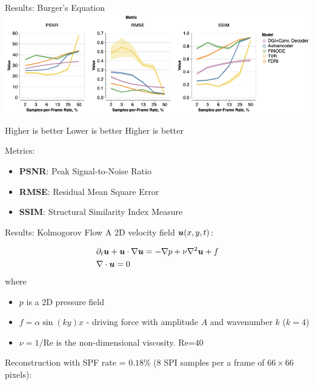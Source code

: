 \documentclass[8pt]{beamer}
\begin{document}
\begin{frame}{Results: Burger's Equation}
	\includegraphics[width=\textwidth]{Figures/cs_burgers_psnr.png}
	
	\vspace{1em}
	
	\hspace{2em} Higher is better \hspace{2.6em} Lower is better \hspace{2.6em} Higher is better
	
	\vspace{1em}
	Metrics:
	\begin{itemize}
		\item \textbf{PSNR}: Peak Signal-to-Noise Ratio 
		\item \textbf{RMSE}: Residual Mean Square Error
		\item \textbf{SSIM}: Structural Similarity Index Measure
	\end{itemize}
\end{frame}

\begin{frame}[label=again]{Results: Kolmogorov Flow}
	A 2D velocity field $\boldsymbol{u}(x, y, t)$:

	\begin{align}
	\label{eq:kolmogorov_flow_definition}
	& \partial_t \boldsymbol{u} + \boldsymbol{u} \cdot \nabla \boldsymbol{u} = -\nabla p + \nu\nabla^2\boldsymbol{u} + f \\
	& \nabla \cdot \boldsymbol{u} = 0
	\end{align}
	where 
	\begin{itemize}
		\item $p$ is a 2D pressure field
		\item $f = \alpha\sin(ky)x$ - driving force with amplitude $A$ and wavenumber $k$ ($k=4$)
		\item $\nu = 1/\text{Re}$ is the non-dimensional viscosity. Re=40
	\end{itemize}
	\vspace{1em}
	Reconstruction with SPF rate = $0.18$\% (8 SPI samples per a frame of $66\times 66$ pixels):  
\end{frame}
\end{document}
